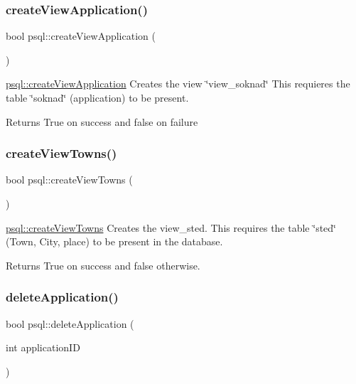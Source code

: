 \subsubsection{\texorpdfstring{create\+View\+Application()}{createViewApplication()}}
{\footnotesize\ttfamily bool psql\+::create\+View\+Application (\begin{DoxyParamCaption}{ }\end{DoxyParamCaption})}



\hyperlink{classpsql_ad6fb8e1e7177c7996f297d477ecceb27}{psql\+::create\+View\+Application} Creates the view \char`\"{}view\+\_\+soknad\char`\"{} This requieres the table \char`\"{}soknad\char`\"{} (application) to be present. 

\begin{DoxyReturn}{Returns}
True on success and false on failure 
\end{DoxyReturn}
\mbox{\label{classpsql_ac5b1230ac405a600b67b144060b33a0d}} 
\subsubsection{\texorpdfstring{create\+View\+Towns()}{createViewTowns()}}
{\footnotesize\ttfamily bool psql\+::create\+View\+Towns (\begin{DoxyParamCaption}{ }\end{DoxyParamCaption})}



\hyperlink{classpsql_ac5b1230ac405a600b67b144060b33a0d}{psql\+::create\+View\+Towns} Creates the view\+\_\+sted. This requires the table \char`\"{}sted\char`\"{} (Town, City, place) to be present in the database. 

\begin{DoxyReturn}{Returns}
True on success and false otherwise. 
\end{DoxyReturn}
\mbox{\label{classpsql_a999ee8e2d813892411ef502ebc055a79}} 
\subsubsection{\texorpdfstring{delete\+Application()}{deleteApplication()}}
{\footnotesize\ttfamily bool psql\+::delete\+Application (\begin{DoxyParamCaption}\item[{int}]{application\+ID }\end{DoxyParamCaption})}



